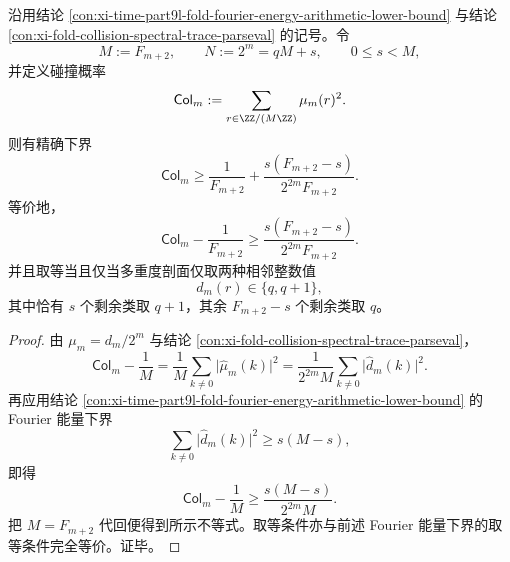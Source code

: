 \begin{corollary}[碰撞概率与均匀性缺口的算术量子化下界]\label{cor:xi-time-part9l-collision-gap-arithmetic-quantization}
沿用结论 \ref{con:xi-time-part9l-fold-fourier-energy-arithmetic-lower-bound} 与结论
\ref{con:xi-fold-collision-spectral-trace-parseval} 的记号。令
\[
M:=F_{m+2},\qquad N:=2^m=qM+s,\qquad 0\le s<M,
\]
并定义碰撞概率
\[
\mathsf{Col}_m:=\sum_{r\in\ZZ/(M\ZZ)}\mu_m(r)^2.
\]
则有精确下界
\[
\boxed{\;
\mathsf{Col}_m
\ge
\frac{1}{F_{m+2}}
+
\frac{s(F_{m+2}-s)}{2^{2m}F_{m+2}}.\;}
\]
等价地，
\[
\boxed{\;
\mathsf{Col}_m-\frac{1}{F_{m+2}}
\ge
\frac{s(F_{m+2}-s)}{2^{2m}F_{m+2}}.\;}
\]
并且取等当且仅当多重度剖面仅取两种相邻整数值
\[
d_m(r)\in\{q,q+1\},
\]
其中恰有 \(s\) 个剩余类取 \(q+1\)，其余 \(F_{m+2}-s\) 个剩余类取 \(q\)。
\end{corollary}

\begin{proof}
由 \(\mu_m=d_m/2^m\) 与结论 \ref{con:xi-fold-collision-spectral-trace-parseval}，
\[
\mathsf{Col}_m-\frac1M
=
\frac{1}{M}\sum_{k\ne 0}\bigl|\widehat\mu_m(k)\bigr|^2
=
\frac{1}{2^{2m}M}\sum_{k\ne 0}\bigl|\widehat d_m(k)\bigr|^2.
\]
再应用结论 \ref{con:xi-time-part9l-fold-fourier-energy-arithmetic-lower-bound} 的 Fourier 能量下界
\[
\sum_{k\ne 0}\bigl|\widehat d_m(k)\bigr|^2\ge s(M-s),
\]
即得
\[
\mathsf{Col}_m-\frac1M\ge \frac{s(M-s)}{2^{2m}M}.
\]
把 \(M=F_{m+2}\) 代回便得到所示不等式。取等条件亦与前述 Fourier 能量下界的取等条件完全等价。证毕。
\end{proof}

